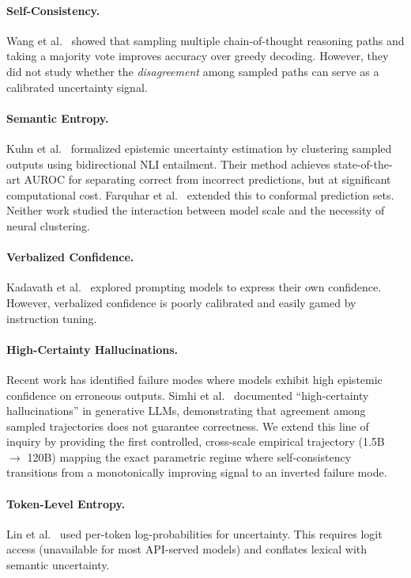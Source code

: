 \documentclass[11pt]{article}
\begin{document}
\paragraph{Self-Consistency.} Wang et al.~\cite{wang2022self} showed that sampling multiple chain-of-thought reasoning paths and taking a majority vote improves accuracy over greedy decoding. However, they did not study whether the \textit{disagreement} among sampled paths can serve as a calibrated uncertainty signal.

\paragraph{Semantic Entropy.} Kuhn et al.~\cite{kuhn2023semantic} formalized epistemic uncertainty estimation by clustering sampled outputs using bidirectional NLI entailment. Their method achieves state-of-the-art AUROC for separating correct from incorrect predictions, but at significant computational cost. Farquhar et al.~\cite{farquhar2024detecting} extended this to conformal prediction sets. Neither work studied the interaction between model scale and the necessity of neural clustering.

\paragraph{Verbalized Confidence.} Kadavath et al.~\cite{kadavath2022language} explored prompting models to express their own confidence. However, verbalized confidence is poorly calibrated and easily gamed by instruction tuning.

\paragraph{High-Certainty Hallucinations.} Recent work has identified failure modes where models exhibit high epistemic confidence on erroneous outputs. Simhi et al.~\cite{simhi2025trust} documented ``high-certainty hallucinations'' in generative LLMs, demonstrating that agreement among sampled trajectories does not guarantee correctness. We extend this line of inquiry by providing the first controlled, cross-scale empirical trajectory (1.5B $\to$ 120B) mapping the exact parametric regime where self-consistency transitions from a monotonically improving signal to an inverted failure mode.

\paragraph{Token-Level Entropy.} Lin et al.~\cite{lin2023generating} used per-token log-probabilities for uncertainty. This requires logit access (unavailable for most API-served models) and conflates lexical with semantic uncertainty.
\end{document}
